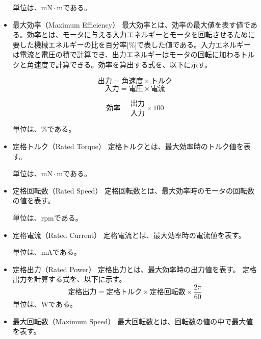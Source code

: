 \documentclass[uplatex, 10pt, a4p]{jsarticle}
\begin{document}
\begin{itemize}
単位は、$\mathrm{mN \cdot m}$である。

\item{最大効率（Maximum Efficiency）}\label{sub:sub:saidaikouritu}
最大効率とは、効率の最大値を表す値である。効率とは、モータに与える入力エネルギーとモータを回転させるために要した機械エネルギーの比を百分率[\%]で表した値である。入力エネルギーは電流と電圧の積で計算でき、出力エネルギーはモータの回転に加わるトルクと角速度で計算できる。効率を算出する式を、以下に示す。

\[
    \mbox{出力} = \mbox{角速度} \times \mbox{トルク}
\]
\[
    \mbox{入力} = \mbox{電圧} \times \mbox{電流}
\]

\[
    \mbox{効率} = \frac{\mbox{出力}}{\mbox{入力}}  \times 100
\]

単位は、$\mathrm{\%}$である。
\item{定格トルク（Rated Torque）}\label{sub:sub:teikakutoruku}
定格トルクとは、最大効率時のトルク値を表す。

単位は、$\mathrm{mN \cdot m}$である。
\item{定格回転数（Rated Speed）}\label{sub:sub:teikakukaiten}
定格回転数とは、最大効率時のモータの回転数の値を表す。

単位は、$\mathrm{rpm}$である。

\item{定格電流（Rated Current）}\label{sub:sub:teikakuden}
定格電流とは、最大効率時の電流値を表す。

単位は、$\mathrm{mA}$である。
\item{定格出力（Rated Power）}\label{sub:sub:teikakusyutu}
定格出力とは、最大効率時の出力値を表す。
定格出力を計算する式を、以下に示す。
\[  \mbox{定格出力} = \mbox{定格トルク} \times \mbox{定格回転数} \times \frac{2\pi}{60}　\]
単位は、$\mathrm{W}$である。
\item{最大回転数（Maximum Speed）}\label{sub:sub:saidaikai}
最大回転数とは、回転数の値の中で最大値を表す。

\end{itemize}
\end{document}
